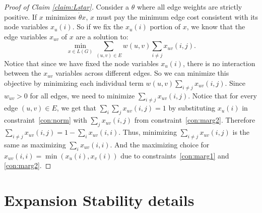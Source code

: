 \begin{proof}[Proof of Claim \ref{claim:Lstar}]
Consider a $\theta$ where all edge weights are strictly positive. 
If $x$ minimizes $\dot{\theta}{x}$, $x$ must pay the minimum edge cost consistent with its node variables $x_u(i)$.
So if we fix the $x_u(i)$ portion of $x$, we know that the edge variables $x_{uv}$ of $x$ are a solution to:
\[ \min_{x \in L(G)} \sum_{(u,v) \in E}w(u,v)\sum_{i\ne j}x_{uv}(i,j). \]
Notice that since we have fixed the node variables $x_u(i)$, there is no interaction between the $x_{uv}$ variables across different edges. 
So we can minimize this objective by minimizing each individual term $w(u,v)\sum_{i\ne j}x_{uv}(i,j)$. 
Since $w_{uv} > 0$ for all edges, we need to minimize $\sum_{i\ne j}x_{uv}(i,j)$. 
Notice that for every edge $(u,v) \in E$, we get that $\sum_{i} \sum_{j} x_{uv}(i,j) = 1$ by substituting $x_u(i)$ in constraint~\ref{con:norm} with $\sum_{j} x_{uv}(i,j)$ from constraint~\ref{con:marg2}. 
Therefore $\sum_{i\ne j} x_{uv}(i,j) = 1 - \sum_{i}x_{uv}(i,i)$. 
Thus, minimizing $\sum_{i\ne j}x_{uv}(i,j)$ is  the same as maximizing $\sum_{i}x_{uv}(i,i)$. 
And the maximizing choice for $x_{uv}(i,i) = \min (x_u(i), x_v(i))$ due to constraints~\ref{con:marg1} and \ref{con:marg2}.
\end{proof}

\section{Expansion Stability details}\label{sec:expansion-stability_details}

